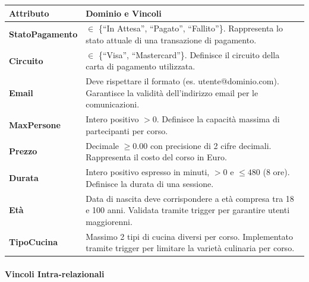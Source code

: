 \begin{center}
\begin{tcolorbox}[colback=white!98!gray, colframe=myblue!80!black, title=Vincoli di Dominio, arc=4mm, boxrule=0.8pt, width=0.98\textwidth]
\renewcommand{\arraystretch}{1.2}
\begin{tabularx}{\textwidth}{p{4cm}X}
\textbf{Attributo} & \textbf{Dominio e Vincoli} \\
\hline
\textbf{StatoPagamento} & $\in$ \{``In Attesa'', ``Pagato'', ``Fallito''\}. Rappresenta lo stato attuale di una transazione di pagamento. \\
\hline
\textbf{Circuito} & $\in$ \{``Visa'', ``Mastercard''\}. Definisce il circuito della carta di pagamento utilizzata. \\
\hline
\textbf{Email} & Deve rispettare il formato (es. utente@dominio.com). Garantisce la validità dell'indirizzo email per le comunicazioni. \\
\hline
\textbf{MaxPersone} & Intero positivo $> 0$. Definisce la capacità massima di partecipanti per corso. \\
\hline
\textbf{Prezzo} & Decimale $\geq 0.00$ con precisione di 2 cifre decimali. Rappresenta il costo del corso in Euro. \\
\hline
\textbf{Durata} & Intero positivo espresso in minuti, $> 0$ e $\leq 480$ (8 ore). Definisce la durata di una sessione. \\
\hline
\textbf{Età} & Data di nascita deve corrispondere a età compresa tra 18 e 100 anni. Validata tramite trigger per garantire utenti maggiorenni. \\
\hline
\textbf{TipoCucina} & Massimo 2 tipi di cucina diversi per corso. Implementato tramite trigger per limitare la varietà culinaria per corso. \\
\hline
\end{tabularx}
\end{tcolorbox}
\end{center}

\paragraph{Vincoli Intra-relazionali}

